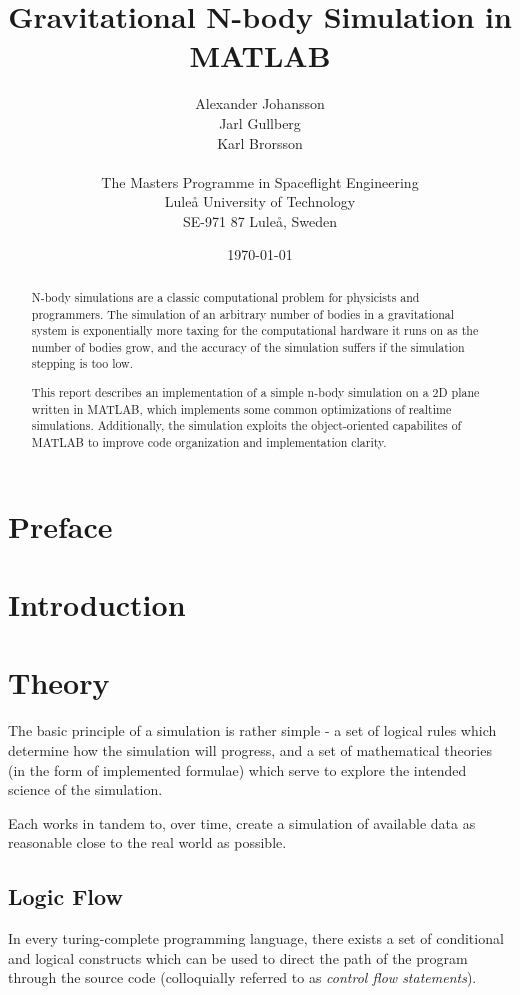 \documentclass[11pt]{article}
\title{\textbf{Gravitational N-body Simulation in MATLAB}}
\author{Alexander Johansson\\
		Jarl Gullberg\\
		Karl Brorsson\\
		\\
		The Masters Programme in Spaceflight Engineering\\
		Luleå University of Technology\\SE-971 87 Luleå, Sweden}
\date{\today}
\begin{document}
\maketitle

\begin{abstract}
N-body simulations are a classic computational problem for physicists and programmers. The simulation of 
an arbitrary number of bodies in a gravitational system is exponentially more taxing for the computational 
hardware it runs on as the number of bodies grow, and the accuracy of the simulation suffers if the simulation
stepping is too low.

This report describes an implementation of a simple n-body simulation on a 2D plane written in MATLAB, which 
implements some common optimizations of realtime simulations. Additionally, the simulation exploits the 
object-oriented capabilites of MATLAB to improve code organization and implementation clarity.
\end{abstract}

\pagebreak
\tableofcontents

\pagebreak
\section{Preface}

\section{Introduction}

\section{Theory}
The basic principle of a simulation is rather simple - a set of logical rules which determine how the 
simulation will progress, and a set of mathematical theories (in the form of implemented formulae) which
serve to explore the intended science of the simulation.

Each works in tandem to, over time, create a simulation of available data as reasonable close to the real 
world as possible.
\subsection{Logic Flow}
In every turing-complete programming language, there exists a set of conditional and logical constructs
which can be used to direct the path of the program through the source code (colloquially referred to as \emph{control flow statements}). 
\end{document}
